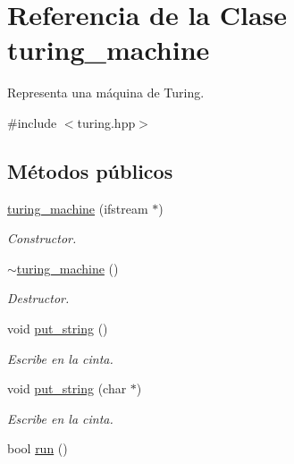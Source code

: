 \hypertarget{classturing__machine}{}\section{Referencia de la Clase turing\+\_\+machine}
\label{classturing__machine}


Representa una máquina de Turing.  




{\ttfamily \#include $<$turing.\+hpp$>$}

\subsection*{Métodos públicos}
\begin{DoxyCompactItemize}
\item 
\hyperlink{classturing__machine_aa95ccff3ecd07d3cee3a50d1af545ee5}{turing\+\_\+machine} (ifstream $\ast$)
\begin{DoxyCompactList}\small\item\em Constructor. \end{DoxyCompactList}\item 
\hypertarget{classturing__machine_a66c386d2beb4d11e4a9097924f9094c7}{}\hyperlink{classturing__machine_a66c386d2beb4d11e4a9097924f9094c7}{$\sim$turing\+\_\+machine} ()\label{classturing__machine_a66c386d2beb4d11e4a9097924f9094c7}

\begin{DoxyCompactList}\small\item\em Destructor. \end{DoxyCompactList}\item 
\hypertarget{classturing__machine_a3d200dac6d24ad9a9340c4b594110238}{}void \hyperlink{classturing__machine_a3d200dac6d24ad9a9340c4b594110238}{put\+\_\+string} ()\label{classturing__machine_a3d200dac6d24ad9a9340c4b594110238}

\begin{DoxyCompactList}\small\item\em Escribe en la cinta. \end{DoxyCompactList}\item 
void \hyperlink{classturing__machine_a18a86be2df1ff27eae1d26c130334699}{put\+\_\+string} (char $\ast$)
\begin{DoxyCompactList}\small\item\em Escribe en la cinta. \end{DoxyCompactList}\item 
\hypertarget{classturing__machine_a9d3b88cd878c42da30102045c36c0d17}{}bool \hyperlink{classturing__machine_a9d3b88cd878c42da30102045c36c0d17}{run} ()\label{classturing__machine_a9d3b88cd878c42da30102045c36c0d17}


\end{DoxyCompactItemize}
